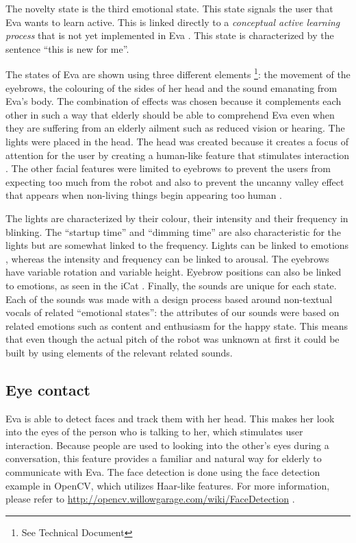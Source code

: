\documentclass[project_eva.tex]{subfiles}
\begin{document}
The novelty state is the third emotional state. This state signals the user that Eva wants to learn active. This is linked 
directly to a \textit{conceptual active learning process} that is not yet implemented in Eva \pageref{sec:Concept}. This state is characterized by the sentence ``this is new for me''.

The states of Eva are shown using three different elements \footnote{See Technical Document}: the movement of the eyebrows, the colouring of the sides of her head  and the sound emanating from Eva’s body. The combination of effects was chosen because it complements each other in such a way that elderly should be able to comprehend Eva even when they are suffering from an elderly ailment such as reduced vision or hearing. The lights were placed in the head. The head was created because it creates a focus of attention for the user by creating a human-like feature that stimulates interaction \cite{elderly}. The other facial features were limited to eyebrows to prevent the users from expecting too much from the robot and also to prevent the uncanny valley effect that appears when non-living things begin appearing too human \cite{uncanny}. 

The lights are characterized by their colour, their intensity and their frequency in blinking. The ``startup time'' and 
``dimming time'' are also characteristic for the lights but are somewhat linked to the frequency. Lights can be linked to 
emotions \cite{colour-emotion} , whereas the intensity and frequency can be linked to arousal. The eyebrows have variable rotation and variable height. Eyebrow positions can also be linked to emotions, as seen in the iCat \cite{iCat}. Finally, the sounds are unique for each state. Each of the sounds was made with a design process based around non-textual vocals of related ``emotional states'': the attributes of our sounds were based on related emotions  such as content and enthusiasm for the happy state. This means that even though the actual pitch of the robot was unknown at first it could be built by using elements \cite{sounds} of the relevant related sounds.

\subsection*{Eye contact}
Eva is able to detect faces and track them with her head. This makes her look into the eyes of the person who is talking to 
her, which stimulates user interaction. Because people are used to looking into the other's eyes during a conversation, 
this feature provides a familiar and natural way for elderly to communicate with Eva. The face detection is done using the 
face detection example in OpenCV, which utilizes Haar-like features. For more information, please refer to 
\url{http://opencv.willowgarage.com/wiki/FaceDetection} \cite{FaceDetection} .
\end{document}
